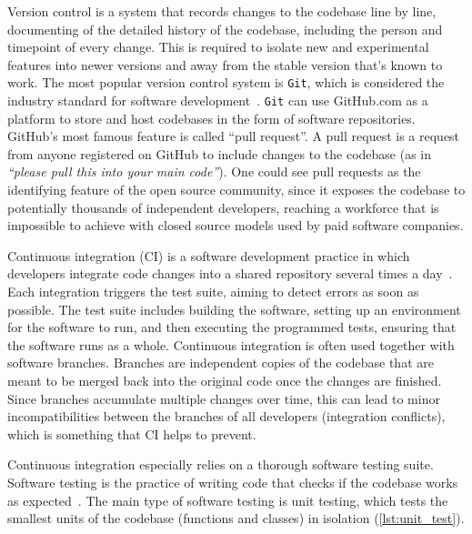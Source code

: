 Version control is a system that records changes to the codebase line by line,
documenting of the detailed history of the codebase, including the person and
timepoint of every change. This is required to isolate new and experimental
features into newer versions and away from the stable version that's known to
work. The most popular version control system is \texttt{Git}, which is considered the
industry standard for software development~\cite{chaconGitBook2024}. \texttt{Git} can use
GitHub.com as a platform to store and host codebases in the form of software
repositories. GitHub's most famous feature is called ``pull request''. A pull
request is a request from anyone registered on GitHub to include changes
to the codebase (as in \textit{``please pull this into your main code''}). One could see
pull requests as the identifying feature of the open source community, since it
exposes the codebase to potentially thousands of independent developers,
reaching a workforce that is impossible to achieve with closed source models
used by paid software companies.

Continuous integration (CI) is a software development practice in which
developers integrate code changes into a shared repository several times a
day~\cite{duvall2007continuous}. Each integration triggers the test suite,
aiming to detect errors as soon as possible. The test suite includes building
the software, setting up an environment for the software to run, and then
executing the programmed tests, ensuring that the software runs as a whole.
Continuous integration is often used together with software branches. Branches
are independent copies of the codebase that are meant to be merged back into the
original code once the changes are finished. Since branches accumulate multiple
changes over time, this can lead to minor incompatibilities between the branches
of all developers (integration conflicts), which is something that CI helps to
prevent.

Continuous integration especially relies on a thorough software testing suite.
Software testing is the practice of writing code that checks if the codebase
works as expected~\cite{10.5555/2161638}. The main type of software testing is
unit testing, which tests the smallest units of the codebase (functions and
classes) in isolation (\autoref{lst:unit_test}).

